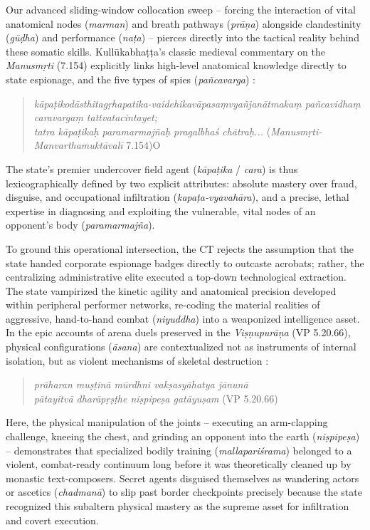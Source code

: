\documentclass[11pt,twoside,letterpaper]{article}
\begin{document}
Our advanced sliding-window collocation sweep – forcing the interaction of vital anatomical nodes (\textit{marman}) and breath pathways (\textit{prāṇa}) alongside clandestinity (\textit{gūḍha}) and performance (\textit{naṭa}) – pierces directly into the tactical reality behind these somatic skills. Kullūkabhaṭṭa’s classic medieval commentary on the \textit{Manusmṛti} (7.154) explicitly links high-level anatomical knowledge directly to state espionage, and the five types of spies (\textit{pañcavarga}) \citep{GRETIL_vcp}:

\begin{quote}
\textit{kāpaṭikodāsthitagṛhapatika-vaidehikavāpasaṃvyañjanātmakaṃ pañcavidhaṃ caravargaṃ tattvatacintayet;} \\
\textit{ tatra kāpaṭikaḥ paramarmajñaḥ pragalbhaś chātraḥ...} (\textit{Manusmṛti-Manvarthamuktāvalī} 7.154)O
\end{quote}

The state’s premier undercover field agent (\textit{kāpaṭika} / \textit{cara}) is thus lexicographically defined by two explicit attributes: absolute mastery over fraud, disguise, and occupational infiltration (\textit{kapaṭa-vyavahāra}), and a precise, lethal expertise in diagnosing and exploiting the vulnerable, vital nodes of an opponent’s body (\textit{paramarmajña}).

To ground this operational intersection, the CT rejects the assumption that the state handed corporate espionage badges directly to outcaste acrobats; rather, the centralizing administrative elite executed a top-down technological extraction. The state vampirized the kinetic agility and anatomical precision developed within peripheral performer networks, re-coding the material realities of aggressive, hand-to-hand combat (\textit{niyuddha}) into a weaponized intelligence asset. In the epic accounts of arena duels preserved in the \textit{Viṣṇupurāṇa} (VP 5.20.66), physical configurations (\textit{āsana}) are contextualized not as instruments of internal isolation, but as violent mechanisms of skeletal destruction \citep{ViP_5}:

\begin{quote}
\textit{prāharan muṣṭinā mūrdhni vakṣasyāhatya jānunā} \\
\textit{pātayitvā dharāpṛṣṭhe niṣpipeṣa gatāyuṣam} (VP 5.20.66)
\end{quote}

Here, the physical manipulation of the joints – executing an arm-clapping challenge, kneeing the chest, and grinding an opponent into the earth (\textit{niṣpipeṣa}) – demonstrates that specialized bodily training (\textit{mallapariśrama}) belonged to a violent, combat-ready continuum long before it was theoretically cleaned up by monastic text-composers. Secret agents disguised themselves as wandering actors or ascetics (\textit{chadmanā}) to slip past border checkpoints precisely because the state recognized this subaltern physical mastery as the supreme asset for infiltration and covert execution.
\end{document}
